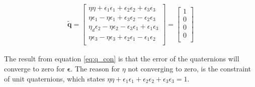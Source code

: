 \begin{equation}
    \begin{aligned}
    \tilde{\boldsymbol{q}}
    =
    \begin{bmatrix}
    \eta \eta + \epsilon_{1} \epsilon_1 + \epsilon_{2} \epsilon_2 + \epsilon_{3} \epsilon_3 \\
    \eta \epsilon_1 - \eta \epsilon_{1} + \epsilon_{3} \epsilon_{2} - \epsilon_{2} \epsilon_{3} \\
    \eta_d \epsilon_2 - \eta \epsilon_{2} - \epsilon_{3} \epsilon_{1} + \epsilon_{1} \epsilon_{3} \\
    \eta \epsilon_3 - \eta \epsilon_{3} + \epsilon_{2} \epsilon_{1} - \epsilon_{1} \epsilon_{2} \\
    \end{bmatrix}
    = 
    \begin{bmatrix}
    1 \\
    0\\
    0 \\
    0 \\
    \end{bmatrix}
    \label{eq:q_con}
    \end{aligned}
\end{equation}

The result from equation \eqref{eq:q_con} is that the error of the quaternions will converge to zero for $\boldsymbol{\epsilon}$. The reason for $\eta$ not converging to zero, is the constraint of unit quaternions, which states $\eta \eta + \epsilon_1 \epsilon_1 + \epsilon_2 \epsilon_2 + \epsilon_3 \epsilon_3 = 1$. 





